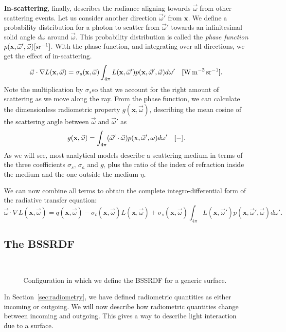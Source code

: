 \textbf{In-scattering}, finally, describes the radiance aligning towards $\vec{\omega}$ from other scattering events. Let us consider another direction $\vec{\omega}'$ from $\mathbf{x}$. We define a probability distribution for a photon to scatter from $\vec{\omega}'$ towards an infinitesimal solid angle $d{\omega}$ around $\vec{\omega}$. This probability distribution is called the \emph{phase function}  $p(\mathbf{x}, \vec{\omega}', \vec{\omega}) \siunitnospace{ \per \steradian}$. With the phase function, and integrating over all directions, we get the effect of in-scattering.
\begin{equation*}
\vec{\omega} \cdot \nabla L(\mathbf{x}, \vec{\omega}) = \sigma_s(\mathbf{x}, \vec{\omega}) \int_{4\pi} L(\mathbf{x}, \vec{\omega}')  p(\mathbf{x}, \vec{\omega}', \vec{\omega}) d {\omega}'\siunit{\watt \per \cubic \metre \per \steradian}.
\end{equation*}
Note the multiplication by $\sigma_s$so that we account for the right amount of scattering as we move along the ray. From the phase function, we can calculate the dimensionless radiometric property $g(\mathbf{x}, \vec{\omega})$, describing the mean cosine of the scattering angle between $\vec{\omega}$ and $\vec{\omega}'$ as
\begin{equation*}
g(\mathbf{x}, \vec{\omega}) = \int_{4\pi} (\vec{\omega}' \cdot \vec{\omega}) p(\mathbf{x}, \vec{\omega}', {\omega}) d{\omega}'
\ \ \ [\SI{}{-}].
\end{equation*}
As we will see, most analytical models describe a scattering medium in terms of the three coefficients $\sigma_s$, $\sigma_a$ and $g$, plus the ratio of the index of refraction inside the medium and the one outside the medium $\eta$.

We can now combine all terms to obtain the complete integro-differential form of the radiative transfer equation:
\begin{equation}
\label{eq:rte}
\vec{\omega} \cdot \nabla L(\mathbf{x}, \vec{\omega}) = q(\mathbf{x}, \vec{\omega}) - \sigma_t(\mathbf{x}, \vec{\omega}) L(\mathbf{x}, \vec{\omega}) + \sigma_s(\mathbf{x}, \vec{\omega}) \int_{4\pi} L(\mathbf{x}, \vec{\omega}')  p(\mathbf{x}, \vec{\omega}', \vec{\omega}) d {\omega}'.
\end{equation}
%
\subsection{The BSSRDF}
\begin{figure}
\centering
   \def\svgwidth{0.8\textwidth}
    \\
\caption{Configuration in which we define the BSSRDF for a generic surface.} %
\label{fig:bssrdf_configuration}
\end{figure}
%
In Section~\ref{sec:radiometry}, we have defined radiometric quantities as either incoming or outgoing. We will now describe how radiometric quantities change between incoming and outgoing. This gives a way to describe light interaction due to a surface.


